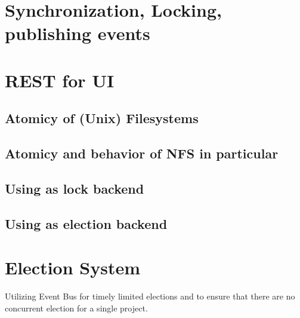 \section{Synchronization, Locking, publishing events}

\section{REST for UI}



\subsection{Atomicy of (Unix) Filesystems}

\subsection{Atomicy and behavior of NFS in particular}

\subsection{Using as lock backend}

\subsection{Using as election backend}



\section{Election System}
\label{design:election}
\label{election:affinity_and_aversion} 


Utilizing Event Bus for timely limited elections and to ensure that there are no concurrent election for a single project.

